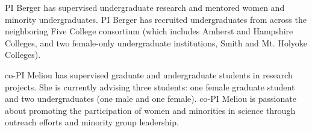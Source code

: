 PI Berger has supervised undergraduate research and
mentored women and minority undergraduates. PI Berger has recruited undergraduates from
across the neighboring Five College consortium (which includes Amherst
and Hampshire Colleges, and two female-only undergraduate institutions,
Smith and Mt. Holyoke Colleges).

co-PI Meliou has supervised graduate and undergraduate students in research projects. She is currently advising three students: one female graduate student and two undergraduates (one male and one female). co-PI Meliou is passionate about promoting the participation of women and minorities in science through outreach efforts and minority group leadership.

